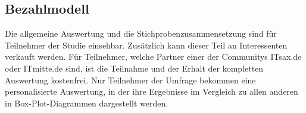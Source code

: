 \subsection{Bezahlmodell}
Die allgemeine Auswertung und die Stichprobenzusammensetzung sind für Teilnehmer der Studie einsehbar. Zusätzlich kann dieser Teil an Interessenten verkauft werden. Für Teilnehmer, welche Partner einer der Communitys ITsax.de oder ITmitte.de sind, ist die Teilnahme und der Erhalt der kompletten Auswertung kostenfrei. Nur Teilnehmer der Umfrage bekommen eine personalisierte Auswertung, in der ihre Ergebnisse im Vergleich zu allen anderen in Box-Plot-Diagrammen dargestellt werden. 